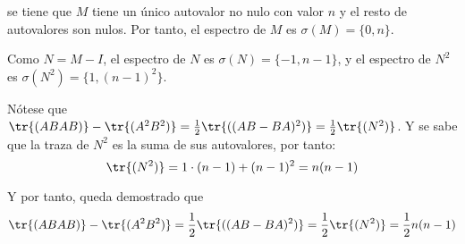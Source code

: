 \documentclass[../../main.tex]{subfiles}
\begin{document}
  se tiene que $M$ tiene un único autovalor no nulo con valor $n$ y el resto de autovalores son nulos. Por tanto, el espectro de $M$ es $\sigma(M) = \{0, n\}$.

  Como $N = M - I$, el espectro de $N$ es $\sigma(N) = \{-1, n - 1\}$, y el espectro de $N^2$ es $\sigma(N^2) = \{1, (n - 1)^2\}$.

  Nótese que $\tr{(ABAB)} - \tr{(A^2 B^2)} = \frac{1}{2}\tr{((AB - BA)^2)} = \frac{1}{2}\tr{(N^2)}$. Y se sabe que la traza de $N^2$ es la suma de sus autovalores, por tanto:
  $$
  \tr{(N^2)} = 1 \cdot (n - 1) + (n - 1)^2 = n (n - 1)
  $$

  Y por tanto, queda demostrado que
  $$
  \tr{(ABAB)} - \tr{(A^2 B^2)} = \frac{1}{2}\tr{((AB - BA)^2)} = \frac{1}{2}\tr{(N^2)} = \frac{1}{2} n (n - 1)
  $$
\end{document}

